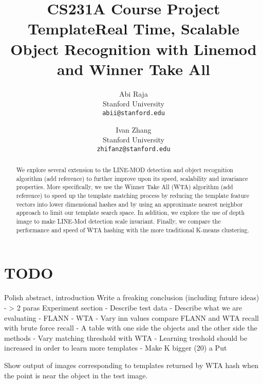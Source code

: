 \documentclass[10pt,twocolumn,letterpaper]{article}
\begin{document}
\title{CS231A Course Project Template}

\title{Real Time, Scalable Object Recognition with Linemod and Winner Take All}
\author{
Abi Raja\\
Stanford University\\
{\tt\small abii@stanford.edu}
\and
Ivan Zhang\\
Stanford University\\
{\tt\small zhifanz@stanford.edu}
}
\maketitle

\maketitle
\thispagestyle{empty}

\begin{abstract}
    We explore several extension to the LINE-MOD detection and object
    recognition algorithm (add reference) to further improve upon its
    speed, scalability and invariance properties. More specifically,
    we use the Winner Take All (WTA) algorithm (add reference) to
    speed up the template matching process by reducing the template
    feature vectors into lower dimensional hashes and by using an
    approximate nearest neighbor approach to limit our template search
    space. In addition, we explore the use of depth image to make
    LINE-Mod detection scale invariant. Finally, we compare the
    performance and speed of WTA hashing with the more traditional
    K-means clustering.
\end{abstract}

\section{TODO}


Polish abstract, introduction
Write a freaking conclusion (including future ideas) - > 2 paras
Experiment section
	 - Describe test data
	 - Describe what we are evaluating
	 - FLANN
	 - WTA
	 - Vary inn values compare FLANN and WTA recall with brute force recall
	 - A table with one side the objects and the other side the methods
	 - Vary matching threshold with WTA
	 - Learning treshold should be increased in order to learn more templates
	 - Make K bigger (20)
	 a
Put 


Show output of images corresponding to templates returned by WTA hash when the point is near the object in the test image.
\end{document}
